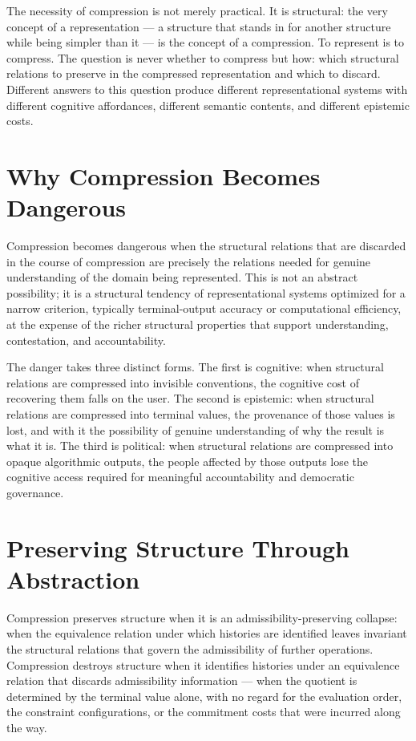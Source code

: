 \documentclass[12pt,openany]{book}
\theoremstyle{plain}
\theoremstyle{definition}
\theoremstyle{remark}
\begin{document}
The necessity of compression is not merely practical. It is structural: the very concept of a representation — a structure that stands in for another structure while being simpler than it — is the concept of a compression. To represent is to compress. The question is never whether to compress but how: which structural relations to preserve in the compressed representation and which to discard. Different answers to this question produce different representational systems with different cognitive affordances, different semantic contents, and different epistemic costs.

\section*{Why Compression Becomes Dangerous}

Compression becomes dangerous when the structural relations that are discarded in the course of compression are precisely the relations needed for genuine understanding of the domain being represented. This is not an abstract possibility; it is a structural tendency of representational systems optimized for a narrow criterion, typically terminal-output accuracy or computational efficiency, at the expense of the richer structural properties that support understanding, contestation, and accountability.

The danger takes three distinct forms. The first is cognitive: when structural relations are compressed into invisible conventions, the cognitive cost of recovering them falls on the user. The second is epistemic: when structural relations are compressed into terminal values, the provenance of those values is lost, and with it the possibility of genuine understanding of why the result is what it is. The third is political: when structural relations are compressed into opaque algorithmic outputs, the people affected by those outputs lose the cognitive access required for meaningful accountability and democratic governance.

\section*{Preserving Structure Through Abstraction}

Compression preserves structure when it is an admissibility-preserving collapse: when the equivalence relation under which histories are identified leaves invariant the structural relations that govern the admissibility of further operations. Compression destroys structure when it identifies histories under an equivalence relation that discards admissibility information — when the quotient is determined by the terminal value alone, with no regard for the evaluation order, the constraint configurations, or the commitment costs that were incurred along the way.
\end{document}
